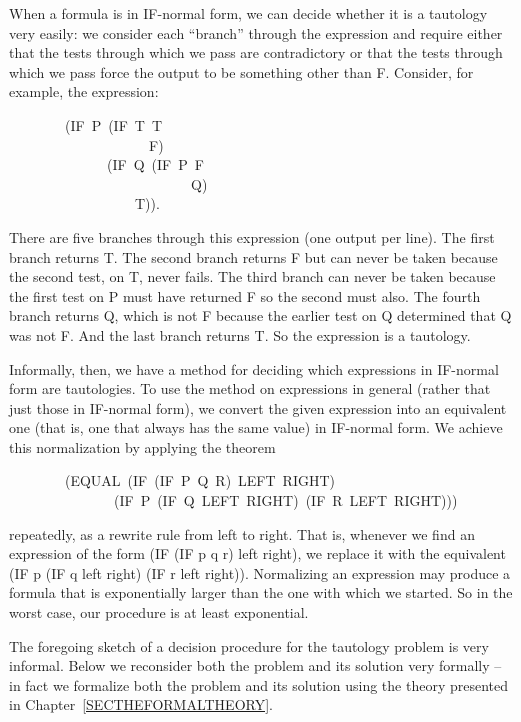 \documentclass[10pt]{book}
\newenvironment{pubasis}{\begin{flushleft}}{\end{flushleft}}
\begin{document}
When a formula is in IF-normal form, we can decide whether
it is a tautology very easily: we  consider each ``branch''
through the expression and require  either that the tests through
which we pass are contradictory or that the tests through which
we pass force the output to be something other than F.  Consider, for example,
the expression:
\begin{pubasis}
~~~~~~~~(IF~P~(IF~T~T\\
~~~~~~~~~~~~~~~~~~~~F)\\
~~~~~~~~~~~~~~(IF~Q~(IF~P~F\\
~~~~~~~~~~~~~~~~~~~~~~~~~~Q)\\
~~~~~~~~~~~~~~~~~~T)).\\
\end{pubasis}
There are five branches through this expression (one output per line).  The first
branch returns T.  The second branch returns F but can never be taken because the
second test, on T, never fails.  The third branch  can never be
taken because the first test on P must have returned F so the
second must also.  The fourth branch returns Q, which is not
F because the earlier test on Q determined that Q was not F.
And the last branch returns T.
So the expression is a tautology.

Informally, then, we have a method for deciding which expressions
in IF-normal form are tautologies.  To use the method on expressions in general (rather
that just those in IF-normal form),
we  convert the given expression into an equivalent one
(that is, one that always has the same value) in
IF-normal form.  We achieve this normalization by applying the
theorem
\begin{pubasis}
~~~~~~~~(EQUAL~(IF~(IF~P~Q~R)~LEFT~RIGHT)\\
~~~~~~~~~~~~~~~(IF~P~(IF~Q~LEFT~RIGHT)~(IF~R~LEFT~RIGHT)))\\
\end{pubasis}
repeatedly, as a rewrite rule from left to right.  That is, whenever
we find an expression of the form (IF (IF p q r) left right), we
replace it with the equivalent (IF p (IF q left right) (IF r left right)).
Normalizing an expression may produce a
formula that is exponentially larger than the one with which
we started.  So in the worst case, our procedure is 
at least exponential.

The foregoing sketch of a decision procedure for the tautology
problem is very informal.   Below we  reconsider both the
problem and its solution very formally -- in fact we 
formalize both the problem and its solution using the
theory presented in Chapter~\ref{SECTHEFORMALTHEORY}.
\end{document}
